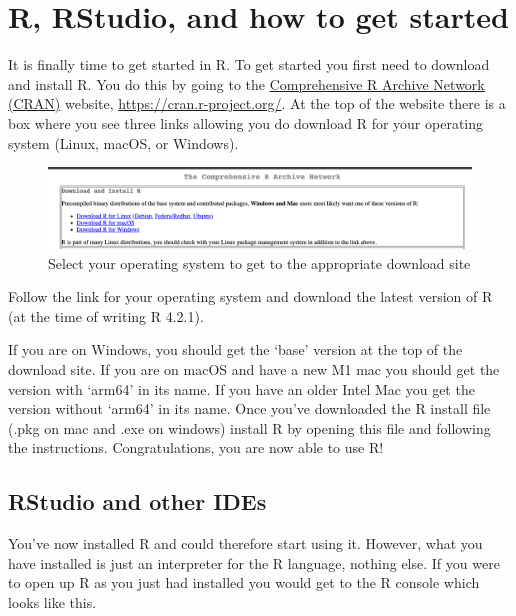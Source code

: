 \documentclass[
]{book}
\begin{document}
\hypertarget{r-rstudio-and-how-to-get-started}{%
\chapter{R, RStudio, and how to get started}\label{r-rstudio-and-how-to-get-started}}

It is finally time to get started in R. To get started you first need to download and install R. You do this by going to the \href{https://cran.r-project.org/}{Comprehensive R Archive Network (CRAN)} website, \url{https://cran.r-project.org/}. At the top of the website there is a box where you see three links allowing you do download R for your operating system (Linux, macOS, or Windows).

\begin{figure}
\centering
\includegraphics{figures/cran.png}
\caption{Select your operating system to get to the appropriate download site}
\end{figure}

Follow the link for your operating system and download the latest version of R (at the time of writing R 4.2.1).

If you are on Windows, you should get the `base' version at the top of the download site. If you are on macOS and have a new M1 mac you should get the version with `arm64' in its name. If you have an older Intel Mac you get the version without `arm64' in its name. Once you've downloaded the R install file (.pkg on mac and .exe on windows) install R by opening this file and following the instructions. Congratulations, you are now able to use R!

\hypertarget{rstudio-and-other-ides}{%
\section{RStudio and other IDEs}\label{rstudio-and-other-ides}}

You've now installed R and could therefore start using it. However, what you have installed is just an interpreter for the R language, nothing else. If you were to open up R as you just had installed you would get to the R console which looks like this.
\end{document}
